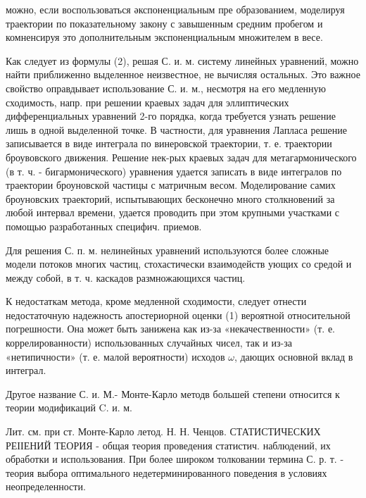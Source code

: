 \documentclass[10pt]{article}
\begin{document}
можно, если воспользоваться әкспоненциальным пре образованием, моделируя траектории по показательному закону с завышенным средним пробегом и комненсируя это дополнительным экспоненциальным множителем в весе.



Как следует из формулы (2), решая С. и. м. систему линейных уравнений, можно найти приближенно выделенное неизвестное, не вычисляя остальных. Это важное свойство оправдывает использование С. и. м., несмотря на его медленную сходимость, напр. при решении краевых задач для эллиптических дифференциальных уравнений 2-го порядка, когда требуется узнать решение лишь в одной выделенной точке. В частности, для уравнения Лапласа решение записывается в виде интеграла по винеровской траектории, т. е. траектории броувовского движения. Решение нек-рых краевых задач для метагармонического (в т. ч. - бигармонического) уравнения удается записать в виде интегралов по траектории броуновской частицы с матричным весом. Моделирование самих броуновских траекторий, испытывающих бесконечно много столкновений за любой интервал времени, удается проводить при этом крупными участками с помощью разработанных специфич. приемов.



Для решения С. п. м. нелинейных уравнений используются более сложные модели потоков многих частиц, стохастически взаимодейств ующих со средой и между собой, в т. ч. каскадов размножающихся частиц.



К недостаткам метода, кроме медленной сходимости, следует отнести недостаточную надежность апостериорной оценки (1) вероятной относительной погрешности. Она может быть занижена как из-за «некачественности» (т. е. коррелированности) использованных случайных чисел, так и из-за «нетипичности» (т. е. малой вероятности) исходов $\omega$, дающих основной вклад в интеграл.



Другое название С. и. М.- Монте-Карло методв большей степени относится $к$ теории модификаций C. и. м.



Лит. см. при ст. Монте-Карло летод. Н. Н. Ченцов. СТАТИСТИЧЕСКИХ РЕІІЕНИЙ ТЕОРИЯ - общая теория проведения статистич. наблюдений, их обработки и использования. При более широком толковании термина С. р. т. - теория выбора оптимального недетерминированного поведения в условиях неопределенности.
\end{document}
